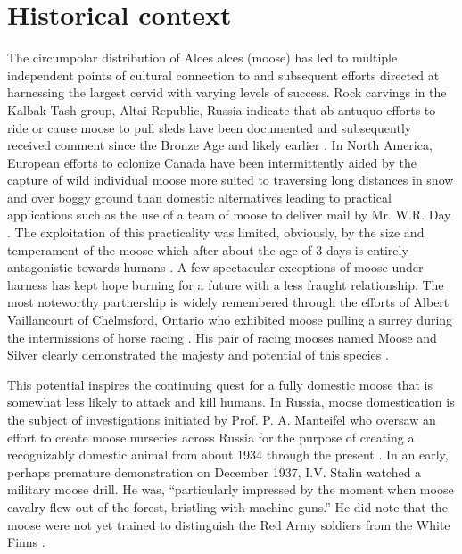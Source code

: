 \section{Historical context}
\label{app:history}

The circumpolar distribution of Alces alces (moose) has led to multiple independent points of cultural connection to and subsequent efforts directed at harnessing the largest cervid with varying levels of success. 
Rock carvings in the Kalbak-Tash group, Altai Republic, Russia indicate that ab antuquo efforts to ride or cause moose to pull sleds have been documented and subsequently received comment since the Bronze Age and likely earlier \citep{useev_2014}.
In North America, European efforts to colonize Canada have been intermittently aided by the capture of wild individual moose more suited to traversing long distances in snow and over boggy ground than domestic alternatives leading to practical applications such as the use of a team of moose to deliver mail by Mr. W.R. Day \citep{archives_unleashed}.
The exploitation of this practicality was limited, obviously, by the size and temperament of the moose which after about the age of 3 days is entirely antagonistic towards humans \citep{sipko_etal_2019}.
A few spectacular exceptions of moose under harness has kept hope burning for a future with a less fraught relationship. 
The most noteworthy partnership is widely remembered through the efforts of Albert Vaillancourt of Chelmsford, Ontario who exhibited moose pulling a surrey during the intermissions of horse racing \citep{chisholm_2019}.
His pair of racing mooses named Moose and Silver clearly demonstrated the majesty and potential of this species \citep{landry_1941}.
 
This potential inspires the continuing quest for a fully domestic moose that is somewhat less likely to attack and kill humans. 
In Russia, moose domestication is the subject of investigations initiated by Prof. P. A. Manteifel who oversaw an effort to create moose nurseries across Russia for the purpose of creating a recognizably domestic animal from about 1934 through the present \citep{sipko_etal_2019}.
In an early, perhaps premature demonstration on December 1937, I.V. Stalin watched a military moose drill. 
He was, “particularly impressed by the moment when moose cavalry flew out of the forest, bristling with machine guns.” He did note that the moose were not yet trained to distinguish the Red Army soldiers from the White Finns \citep{pererva_2017}.
